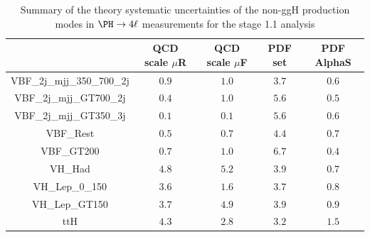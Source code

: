 \begin{table}[!htb]
\begin{center}
\small
\label{tab:SystOverviewTheo}
\caption{Summary of the theory systematic uncertainties of the non-ggH production modes in $\Hllll$ measurements for the stage 1.1 analysis}
\begin{tabular}{|c|c|c|c|c|}
\hline %
& QCD scale $\mu$R & QCD scale $\mu$F & PDF set  & PDF AlphaS \\ 
\hline %
VBF\_2j\_mjj\_350\_700\_2j&  $0.9$& $1.0$& $3.7$& $0.6$\\ 
VBF\_2j\_mjj\_GT700\_2j&     $0.4$& $1.0$& $5.6$& $0.5$\\ 
VBF\_2j\_mjj\_GT350\_3j&     $0.1$& $0.1$& $5.6$& $0.6$\\ 
VBF\_Rest& 		     $0.5$& $0.7$& $4.4$& $0.7$\\ 
VBF\_GT200&		     $0.7$& $1.0$& $6.7$& $0.4$\\ 
VH\_Had&	             $4.8$& $5.2$& $3.9$& $0.7$\\ 
VH\_Lep\_0\_150&	     $3.6$& $1.6$& $3.7$& $0.8$\\ 
VH\_Lep\_GT150&		     $3.7$& $4.9$& $3.9$& $0.9$\\ 
ttH&		     	     $4.3$& $2.8$& $3.2$& $1.5$\\ 
\hline %
\end{tabular}
\normalsize
\end{center}
\end{table}

